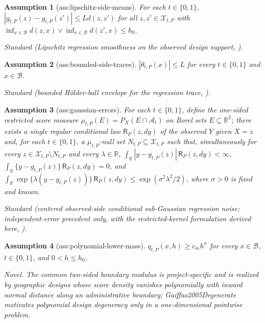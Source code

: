 \documentclass{article}
\newtheorem{assumption}{Assumption}
\begin{document}
\begin{assumption}[ass:lipschitz-side-means]\label{ass:lipschitz-side-means}
For each \(t\in\{0,1\}\), \(|g_{t,P}(z)-g_{t,P}(z')|\le Ld(z,z')\) for all \(z,z'\in\mathcal X_{t,P}\) with \(\inf_{x\in\mathcal B}d(z,x)\vee\inf_{x\in\mathcal B}d(z',x)\le h_0\).
\par\smallskip\noindent\emph{Standard} (Lipschitz regression smoothness on the observed design support, \cite{Gaiffas2005Degenerate}).
\end{assumption}

\begin{assumption}[ass:bounded-side-traces]\label{ass:bounded-side-traces}
\(|\theta_{t,P}(x)|\le L\) for every \(t\in\{0,1\}\) and \(x\in\mathcal B\).
\par\smallskip\noindent\emph{Standard} (bounded Hölder-ball envelope for the regression trace, \cite{Gaiffas2005Degenerate}).
\end{assumption}

\begin{assumption}[ass:gaussian-errors]\label{ass:gaussian-errors}
For each \(t\in\{0,1\}\), define the one-sided restricted score measure \(\mu_{t,P}(E)=P_X(E\cap\mathcal A_t)\) on Borel sets \(E\subseteq\mathbb R^2\); there exists a single regular conditional law \(\mathsf R_P(z,dy)\) of the observed \(Y\) given \(X=z\) and, for each \(t\in\{0,1\}\), a \(\mu_{t,P}\)-null set \(N_{t,P}\subseteq\mathcal X_{t,P}\) such that, simultaneously for every \(z\in\mathcal X_{t,P}\setminus N_{t,P}\) and every \(\lambda\in\mathbb R\), \(\int_{\mathbb R}|y-g_{t,P}(z)|\,\mathsf R_P(z,dy)<\infty\), \(\int_{\mathbb R}\{y-g_{t,P}(z)\}\,\mathsf R_P(z,dy)=0\), and \(\int_{\mathbb R}\exp\{\lambda(y-g_{t,P}(z))\}\,\mathsf R_P(z,dy)\le\exp(\sigma^2\lambda^2/2)\), where \(\sigma>0\) is fixed and known.
\par\smallskip\noindent\emph{Standard} (centered observed-side conditional sub-Gaussian regression noise; independent-error precedent only, with the restricted-kernel formulation derived here, \cite{HarisShojaieSimon2019AdaptiveTruncation}).
\end{assumption}

\begin{assumption}[ass:polynomial-lower-mass]\label{ass:polynomial-lower-mass}
\(q_{t,P}(x,h)\ge c_m h^{\kappa}\) for every \(x\in\mathcal B\), \(t\in\{0,1\}\), and \(0<h\le h_0\).
\par\smallskip\noindent\emph{Novel.} The common two-sided boundary modulus is project-specific and is realized by geographic designs whose score density vanishes polynomially with inward normal distance along an administrative boundary; Gaiffas2005Degenerate motivates polynomial design degeneracy only in a one-dimensional pointwise problem.
\end{assumption}
\end{document}

